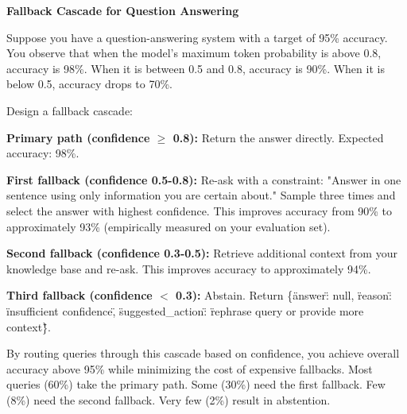 \begin{examplebox}
\textbf{Fallback Cascade for Question Answering}

\vspace{0.5em}

Suppose you have a question-answering system with a target of 95\% accuracy. You observe that when the model's maximum token probability is above 0.8, accuracy is 98\%. When it is between 0.5 and 0.8, accuracy is 90\%. When it is below 0.5, accuracy drops to 70\%.

\vspace{0.5em}

Design a fallback cascade:

\vspace{0.5em}

\textbf{Primary path (confidence $\geq$ 0.8):} Return the answer directly. Expected accuracy: 98\%.

\vspace{0.5em}

\textbf{First fallback (confidence 0.5-0.8):} Re-ask with a constraint: "Answer in one sentence using only information you are certain about." Sample three times and select the answer with highest confidence. This improves accuracy from 90\% to approximately 93\% (empirically measured on your evaluation set).

\vspace{0.5em}

\textbf{Second fallback (confidence 0.3-0.5):} Retrieve additional context from your knowledge base and re-ask. This improves accuracy to approximately 94\%.

\vspace{0.5em}

\textbf{Third fallback (confidence $<$ 0.3):} Abstain. Return \{\"answer\": null, \"reason\": \"insufficient confidence\", \"suggested\_action\": \"rephrase query or provide more context\"\}.

\vspace{0.5em}

By routing queries through this cascade based on confidence, you achieve overall accuracy above 95\% while minimizing the cost of expensive fallbacks. Most queries (60\%) take the primary path. Some (30\%) need the first fallback. Few (8\%) need the second fallback. Very few (2\%) result in abstention.
\end{examplebox}

\vspace{1.5em}

